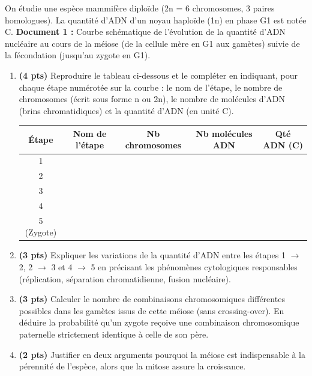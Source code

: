\documentclass[11pt]{article}
\begin{document}
\begin{exercice}
On étudie une espèce mammifère diploïde (2n = 6 chromosomes, 3 paires homologues). La quantité d'ADN d'un noyau haploïde (1n) en phase G1 est notée C.  
\textbf{Document 1 :} Courbe schématique de l'évolution de la quantité d'ADN nucléaire au cours de la méiose (de la cellule mère en G1 aux gamètes) suivie de la fécondation (jusqu'au zygote en G1).
\begin{enumerate}
    \item \textbf{(4 pts)} Reproduire le tableau ci-dessous et le compléter en indiquant, pour chaque étape numérotée sur la courbe : le nom de l'étape, le nombre de chromosomes (écrit sous forme n ou 2n), le nombre de molécules d'ADN (brins chromatidiques) et la quantité d'ADN (en unité C).
    \begin{tabular}{|c|c|c|c|c|}
    \hline \textbf{Étape} & \textbf{Nom de l'étape} & \textbf{Nb chromosomes} & \textbf{Nb molécules ADN} & \textbf{Qté ADN (C)} \\ \hline
    1 & & & & \\ \hline
    2 & & & & \\ \hline
    3 & & & & \\ \hline
    4 & & & & \\ \hline
    5 (Zygote) & & & & \\ \hline
    \end{tabular}
    \item \textbf{(3 pts)} Expliquer les variations de la quantité d'ADN entre les étapes 1 $\to$ 2, 2 $\to$ 3 et 4 $\to$ 5 en précisant les phénomènes cytologiques responsables (réplication, séparation chromatidienne, fusion nucléaire).
    \item \textbf{(3 pts)} Calculer le nombre de combinaisons chromosomiques différentes possibles dans les gamètes issus de cette méiose (sans crossing-over). En déduire la probabilité qu'un zygote reçoive une combinaison chromosomique paternelle strictement identique à celle de son père.
    \item \textbf{(2 pts)} Justifier en deux arguments pourquoi la méiose est indispensable à la pérennité de l'espèce, alors que la mitose assure la croissance.
\end{enumerate}
\end{exercice}
\end{document}
